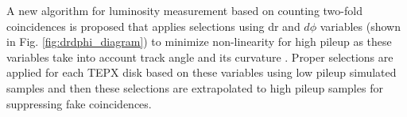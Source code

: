 A new algorithm for luminosity measurement based on counting two-fold coincidences is proposed that applies selections using dr and $d\phi$ variables (shown in Fig. \ref{fig:drdphi_diagram}) to minimize non-linearity for high pileup as these variables take into account track angle and its curvature \cite{sehrawat2020}.  Proper selections are applied for each TEPX disk based on these variables using low pileup simulated samples and then these selections are extrapolated to high pileup samples for suppressing fake coincidences.


